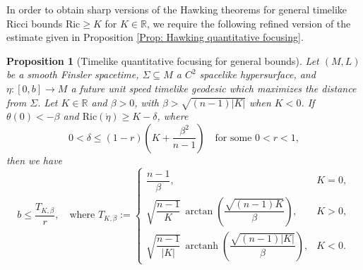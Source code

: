 \documentclass[a4paper,11pt]{article}
\numberwithin{equation}{section}
\theoremstyle{definition}
\theoremstyle{plain}
\newtheorem{Proposition}[Definition]{Proposition}
\newcommand{\R}{\mathbb R}
\newcommand{\Ric}{\mathrm{Ric}}
\begin{document}
In order to obtain sharp versions of the Hawking theorems for general timelike Ricci bounds $\Ric \geq K$ for $K \in \R$, we require the following refined version of the estimate given in Proposition \ref{Prop: Hawking quantitative focusing}.

\begin{Proposition}[Timelike quantitative focusing for general bounds]
\label{Prop: quantitative focusing for general bounds}
Let $(M,L)$ be a smooth Finsler spacetime, $\Sigma\subseteq M$ a $C^2$ spacelike hypersurface, and $\eta:[0,b]\to M$ a future unit speed timelike
geodesic which maximizes the distance from $\Sigma$.
Let $K\in\mathbb R$ and $\beta>0$, with $\beta>\sqrt{(n-1)|K|}$ when $K<0$.
If $\theta(0)<-\beta$ and $\Ric(\dot\eta)\geq K-\delta$, where
\[
    0<\delta
    \leq(1-r)\left(K+\frac{\beta^2}{n-1}\right)
    \quad\text{for some }0<r<1,
\]
then we have
\begin{equation*}
    b\leq\frac{T_{K,\beta}}{r},
    \quad \text{where }
    T_{K,\beta}:=
    \begin{cases}
        \dfrac{n-1}{\beta},
        & K=0,\\[1.2ex]
        \sqrt{\dfrac{n-1}{K}}\,
        \operatorname{arctan}\!
        \left(\dfrac{\sqrt{(n-1)K}}{\beta}\right),
        & K>0,\\[1.6ex]
        \sqrt{\dfrac{n-1}{|K|}}\,
        \operatorname{arctanh}\!
        \left(\dfrac{\sqrt{(n-1)|K|}}{\beta}\right),
        & K<0.
    \end{cases}
\end{equation*}
\end{Proposition}
\end{document}
